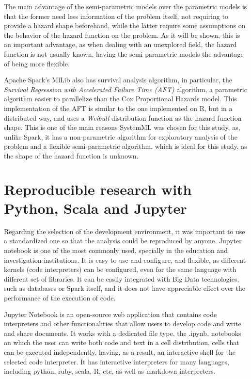 \documentclass[11pt]{book} %
\begin{document}
      The main advantage of the semi-parametric models over the parametric models is that the former need less information of the problem itself, not requiring to provide a hazard shape beforehand, while the latter require some assumptions on the behavior of the hazard function on the problem. As it will be shown, this is an important advantage, as when dealing with an unexplored field, the hazard function is not usually known, having the semi-parametric models the advantage of being more flexible.

      Apache Spark's MlLib also has survival analysis algorithm, in particular, the \emph{Survival Regression with Accelerated Failure Time (AFT)} algorithm, a parametric algorithm easier to parallelize than the Cox Proportional Hazards model. This implementation of the AFT is similar to the one implemented on R, but in a distributed way, and uses a \emph{Weibull} distribution function as the hazard function shape. This is one of the main reasons SystemML was chosen for this study, as, unlike Spark, it has a non-parametric algorithm for exploratory analysis of the problem and a flexible semi-parametric algorithm, which is ideal for this study, as the shape of the hazard function is unknown.

  \section{Reproducible research with Python, Scala and Jupyter}

    Regarding the selection of the development environment, it was important to use a standardized one so that the analysis could be reproduced by anyone. Jupyter notebook is one of the most commonly used, specially in the education and investigation institutions. It is easy to use and configure, and flexible, as different kernels (code interpreters) can be configured, even for the same language with different set of libraries. It can be easily integrated with Big Data technologies, such as databases or Spark itself, and it does not have appreciable effect over the performance of the execution of code.

    Jupyter Notebook is an open-source web application that contains code interpreters and other functionalities that allow users to develop code and write and share documents. It works with a dedicated file type, the .ipynb, notebooks on which the user can write both code and text in a cell distribution, cells that can be executed independently, having, as a result, an interactive shell for the selected code interpreter. It has interactive interpreters for many languages, including python, ruby, scala, R, etc, as well as markdown interpreters.
\end{document}
